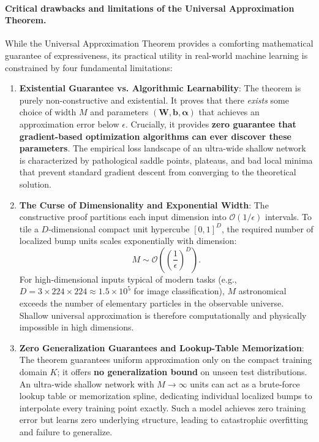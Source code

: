 \paragraph{Critical drawbacks and limitations of the Universal Approximation Theorem.}
While the Universal Approximation Theorem provides a comforting mathematical guarantee of expressiveness, its practical utility in real-world machine learning is constrained by four fundamental limitations:
\begin{enumerate}[noitemsep,topsep=2pt,parsep=0pt,partopsep=0pt]
  \item \textbf{Existential Guarantee vs. Algorithmic Learnability}: The theorem is purely non-constructive and existential. It proves that there \textit{exists} some choice of width $M$ and parameters $(\mathbf{W}, \mathbf{b}, \boldsymbol{\alpha})$ that achieves an approximation error below $\epsilon$. Crucially, it provides \textbf{zero guarantee that gradient-based optimization algorithms can ever discover these parameters}. The empirical loss landscape of an ultra-wide shallow network is characterized by pathological saddle points, plateaus, and bad local minima that prevent standard gradient descent from converging to the theoretical solution.
  \item \textbf{The Curse of Dimensionality and Exponential Width}: The constructive proof partitions each input dimension into $\mathcal{O}(1/\epsilon)$ intervals. To tile a $D$-dimensional compact unit hypercube $[0, 1]^D$, the required number of localized bump units scales exponentially with dimension:
  \begin{equation}
  M \sim \mathcal{O}\left( \left(\frac{1}{\epsilon}\right)^D \right).
  \label{eq:exponential_width_curse}
  \end{equation}
  For high-dimensional inputs typical of modern tasks (e.g., $D = 3 \times 224 \times 224 \approx 1.5 \times 10^5$ for image classification), $M$ astronomical exceeds the number of elementary particles in the observable universe. Shallow universal approximation is therefore computationally and physically impossible in high dimensions.
  \item \textbf{Zero Generalization Guarantees and Lookup-Table Memorization}: The theorem guarantees uniform approximation only on the compact training domain $K$; it offers \textbf{no generalization bound} on unseen test distributions. An ultra-wide shallow network with $M \to \infty$ units can act as a brute-force lookup table or memorization spline, dedicating individual localized bumps to interpolate every training point exactly. Such a model achieves zero training error but learns zero underlying structure, leading to catastrophic overfitting and failure to generalize.

\end{enumerate}
